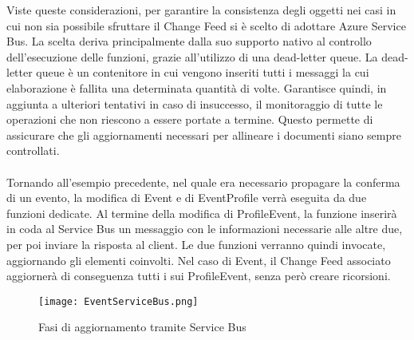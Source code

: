 Viste queste considerazioni,
per garantire la consistenza degli oggetti nei casi in cui non sia possibile sfruttare il Change Feed
si è scelto di adottare Azure Service Bus.
La scelta deriva principalmente dalla suo supporto nativo al controllo dell'esecuzione delle funzioni,
grazie all'utilizzo di una dead-letter queue.
La dead-letter queue è un contenitore in cui vengono inseriti
tutti i messaggi la cui elaborazione è fallita una determinata quantità di volte.
Garantisce quindi, in aggiunta a ulteriori tentativi in caso di insuccesso,
il monitoraggio di tutte le operazioni che non riescono a essere portate a termine.
Questo permette di assicurare che gli aggiornamenti necessari per allineare i documenti
siano sempre controllati.\\
\\
Tornando all'esempio precedente,
nel quale era necessario propagare la conferma di un evento,
la modifica di Event e di EventProfile verrà eseguita da due funzioni dedicate.
Al termine della modifica di ProfileEvent,
la funzione inserirà in coda al Service Bus un messaggio
con le informazioni necessarie alle altre due,
per poi inviare la risposta al client.
Le due funzioni verranno quindi invocate,
aggiornando gli elementi coinvolti.
Nel caso di Event, il Change Feed associato aggiornerà di conseguenza
tutti i sui ProfileEvent, senza però creare ricorsioni.\\

\begin{figure}[h!]
    \centering
    \texttt{[image: EventServiceBus.png]}
    \caption{Fasi di aggiornamento tramite Service Bus}
\end{figure}




\clearpage